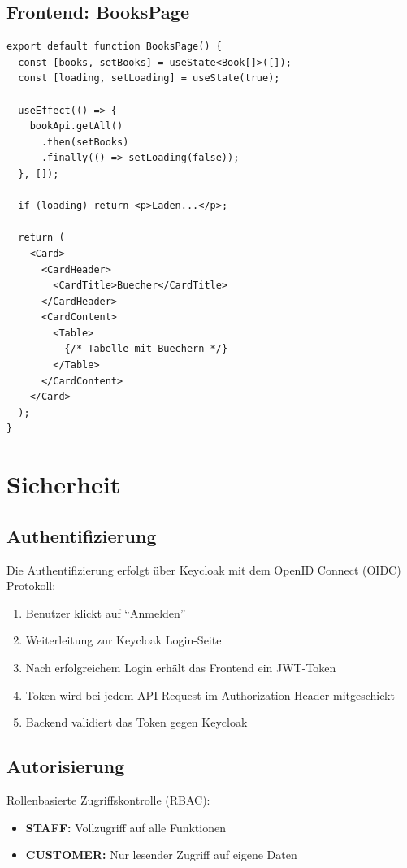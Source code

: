 \documentclass[a4paper,12pt,twoside]{report}
\begin{document}
\newpage

\subsection{Frontend: BooksPage}

\begin{lstlisting}[language=tsx, caption=BooksPage.tsx (Auszug)]
export default function BooksPage() {
  const [books, setBooks] = useState<Book[]>([]);
  const [loading, setLoading] = useState(true);

  useEffect(() => {
    bookApi.getAll()
      .then(setBooks)
      .finally(() => setLoading(false));
  }, []);

  if (loading) return <p>Laden...</p>;

  return (
    <Card>
      <CardHeader>
        <CardTitle>Buecher</CardTitle>
      </CardHeader>
      <CardContent>
        <Table>
          {/* Tabelle mit Buechern */}
        </Table>
      </CardContent>
    </Card>
  );
}
\end{lstlisting}

\newpage

\section{Sicherheit}

\subsection{Authentifizierung}
Die Authentifizierung erfolgt über Keycloak mit dem OpenID Connect (OIDC) Protokoll:

\begin{enumerate}
    \item Benutzer klickt auf ``Anmelden''
    \item Weiterleitung zur Keycloak Login-Seite
    \item Nach erfolgreichem Login erhält das Frontend ein JWT-Token
    \item Token wird bei jedem API-Request im Authorization-Header mitgeschickt
    \item Backend validiert das Token gegen Keycloak
\end{enumerate}

\subsection{Autorisierung}
Rollenbasierte Zugriffskontrolle (RBAC):
\begin{itemize}
    \item \textbf{STAFF:} Vollzugriff auf alle Funktionen
    \item \textbf{CUSTOMER:} Nur lesender Zugriff auf eigene Daten
\end{itemize}
\end{document}
